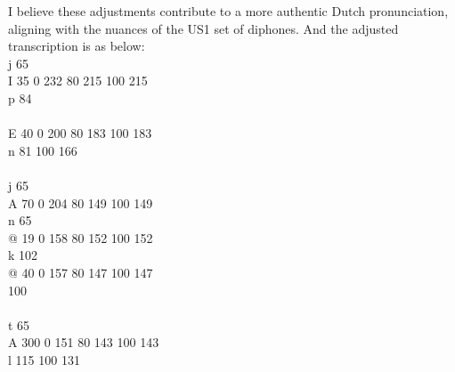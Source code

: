\documentclass{../labbook}
\begin{document}
\begin{solution}
    I believe these adjustments contribute to a more authentic Dutch pronunciation, aligning with the nuances of the US1 set of diphones. And the adjusted transcription is as below:\\
\indent    j	65\\
\indent    I	35	 0 232 80 215 100 215\\
\indent    p	84\\
    \\
\indent    E	40	 0 200 80 183 100 183\\
\indent    n	81	100 166\\
    \\
\indent    j	65\\
\indent    A	70	 0 204 80 149 100 149\\
\indent    n	65\\
\indent    @	19	 0 158 80 152 100 152\\
\indent    k	102\\
\indent    @	40	 0 157 80 147 100 147\\
\indent    \uline{ }	100\\
    \\
\indent    t	65\\
\indent    A	300	 0 151 80 143 100 143\\
\indent    l	115	100 131

\end{solution}
\end{document}
